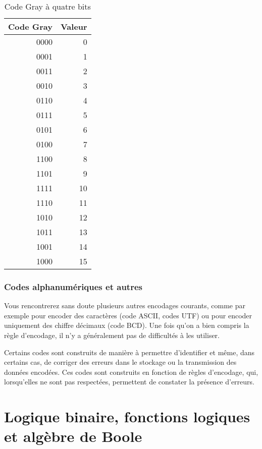 \documentclass[11pt]{article}
\begin{document}
\begin{table}[htbp]
\caption{\label{tab:org5783556}Code Gray à quatre bits}
\centering
\begin{tabular}{rr}
Code Gray & Valeur\\
\hline
0000 & 0\\
0001 & 1\\
0011 & 2\\
0010 & 3\\
0110 & 4\\
0111 & 5\\
0101 & 6\\
0100 & 7\\
1100 & 8\\
1101 & 9\\
1111 & 10\\
1110 & 11\\
1010 & 12\\
1011 & 13\\
1001 & 14\\
1000 & 15\\
\end{tabular}
\end{table}


\subsubsection{Codes alphanumériques et autres}
\label{sec:orgaa027ff}

Vous rencontrerez sans doute plusieurs autres encodages courants,
comme par exemple pour encoder des caractères (code ASCII, codes UTF)
ou pour encoder uniquement des chiffre décimaux (code BCD). Une fois
qu'on a bien compris la règle d'encodage, il n'y a généralement pas de
difficultés à les utiliser.

Certains codes sont construits de manière à permettre d’identifier et
même, dans certains cas, de corriger des erreurs dans le stockage ou
la transmission des données encodées. Ces codes sont construits en
fonction de règles d'encodage, qui, lorsqu'elles ne sont pas
respectées, permettent de constater la présence d'erreurs.

\section{Logique binaire, fonctions logiques et algèbre de Boole}
\label{sec:orge43d316}
\end{document}
